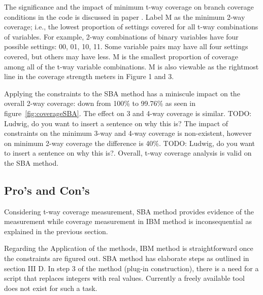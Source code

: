 \documentclass[conference]{IEEEtran}
\newcommand{\todo}[1]{}
\renewcommand{\todo}[1]{{\color{red} TODO: {#1}}}
\begin{document}
	The significance and the impact of minimum t-way coverage on branch coverage conditions in the code is discussed in paper \cite{kuhn2016measuring}. 
	Label M as the minimum 2-way coverage; i.e., the lowest proportion of settings covered for all t-way combinations of variables. 
	For example, 2-way combinations of binary variables have four possible settings: 00, 01, 10, 11. Some variable pairs may have all four settings covered, but others may have less. 
	M is the smallest proportion of coverage among all of the t-way variable combinations.  M is also viewable as the rightmost line in the coverage strength meters in Figure 1 and 3. 
	
	
	Applying the constraints to the SBA method has a miniscule impact on the overall 2-way coverage: down from 100\% to 99.76\% as seen in figure~\ref{fig:coverageSBA}. 
	The effect on 3 and 4-way coverage is similar. 
	\todo{Ludwig, do you want to insert a sentence on why this is?}
	The impact of constraints on the minimum 3-way and 4-way coverage is non-existent, however on minimum 2-way coverage the difference is 40\%. \todo{Ludwig, do you want to insert a sentence on why this is?}.
	Overall, t-way coverage analysis is valid on the SBA method. 
		
	\subsection{Pro's and Con's }
	
	Considering t-way coverage measurement, SBA method provides evidence of the measurement while coverage measurement in IBM method is inconsequential as explained in the previous section. 
		
	Regarding the Application of the methods, IBM method is straightforward once the constraints are figured out. 
	SBA method has elaborate steps as outlined in section III D. 
	In step 3 of the method (plug-in construction), there is a need for a script that replaces integers with real values.
	Currently a freely available tool does not exist for such a task.
	
\end{document}
